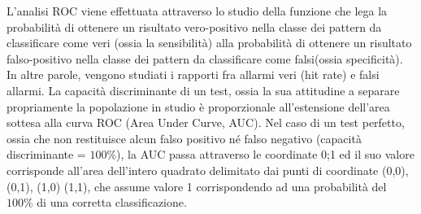 L’analisi ROC viene effettuata attraverso lo studio della funzione che  lega la probabilità di ottenere un risultato vero-positivo nella classe dei pattern da classificare come veri (ossia la sensibilità) alla probabilità di ottenere un risultato falso-positivo nella classe dei pattern da classificare come falsi(ossia specificità). In altre parole, vengono studiati i rapporti fra allarmi veri (hit rate) e falsi allarmi. La capacità discriminante di un test, ossia la sua attitudine a separare propriamente la popolazione in studio è proporzionale all’estensione dell’area sottesa alla curva ROC (Area Under Curve, AUC). Nel caso di un test perfetto, ossia che non restituisce alcun falso positivo né falso negativo (capacità discriminante = $100\%$), la AUC passa attraverso le coordinate {0;1} ed il suo valore corrisponde all’area dell’intero quadrato delimitato dai punti di coordinate (0,0), (0,1), (1,0) (1,1), che assume valore 1 corrispondendo ad una probabilità del $100\%$ di una corretta classificazione. 

